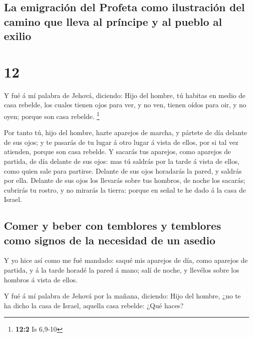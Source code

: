 \hypertarget{la-emigraciuxf3n-del-profeta-como-ilustraciuxf3n-del-camino-que-lleva-al-pruxedncipe-y-al-pueblo-al-exilio}{%
\subsection{La emigración del Profeta como ilustración del camino que
lleva al príncipe y al pueblo al
exilio}\label{la-emigraciuxf3n-del-profeta-como-ilustraciuxf3n-del-camino-que-lleva-al-pruxedncipe-y-al-pueblo-al-exilio}}

\hypertarget{section-11}{%
\section{12}\label{section-11}}

 Y fué á mí palabra de Jehová, diciendo: 
Hijo del hombre, tú habitas en medio de casa rebelde, los cuales tienen
ojos para ver, y no ven, tienen oídos para oir, y no oyen; porque son
casa rebelde. \footnote{\textbf{12:2} Is 6,9-10}

 Por tanto tú, hijo del hombre, hazte aparejos de marcha,
y pártete de día delante de sus ojos; y te pasarás de tu lugar á otro
lugar á vista de ellos, por si tal vez atienden, porque son casa
rebelde.  Y sacarás tus aparejos, como aparejos de
partida, de día delante de sus ojos: mas tú saldrás por la tarde á vista
de ellos, como quien sale para partirse.  Delante de sus
ojos horadarás la pared, y saldrás por ella.  Delante de
sus ojos los llevarás sobre tus hombros, de noche los sacarás; cubrirás
tu rostro, y no mirarás la tierra: porque en señal te he dado á la casa
de Israel.

\hypertarget{comer-y-beber-con-temblores-y-temblores-como-signos-de-la-necesidad-de-un-asedio}{%
\subsection{Comer y beber con temblores y temblores como signos de la
necesidad de un
asedio}\label{comer-y-beber-con-temblores-y-temblores-como-signos-de-la-necesidad-de-un-asedio}}

 Y yo hice así como me fué mandado: saqué mis aparejos de
día, como aparejos de partida, y á la tarde horadé la pared á mano; salí
de noche, y llevélos sobre los hombros á vista de ellos.

 Y fué á mí palabra de Jehová por la mañana, diciendo:
 Hijo del hombre, ¿no te ha dicho la casa de Israel,
aquella casa rebelde: ¿Qué haces?

